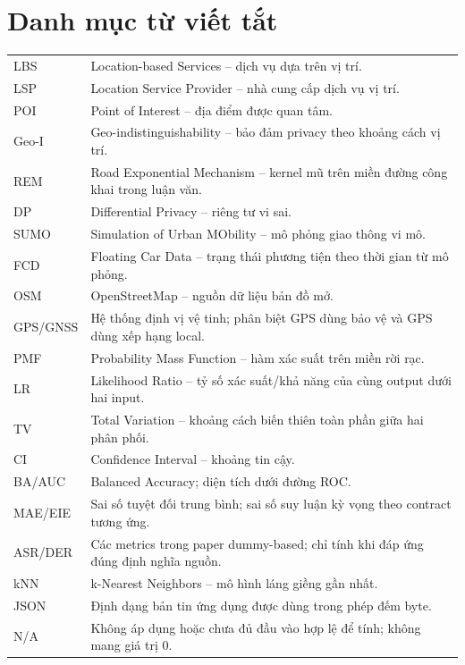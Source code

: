 \chapter*{Danh mục từ viết tắt}
\begin{small}
\begin{longtable}{@{}P{2.1cm}P{13.4cm}@{}}
LBS & Location-based Services -- dịch vụ dựa trên vị trí.\\
LSP & Location Service Provider -- nhà cung cấp dịch vụ vị trí.\\
POI & Point of Interest -- địa điểm được quan tâm.\\
Geo-I & Geo-indistinguishability -- bảo đảm privacy theo khoảng cách vị trí.\\
REM & Road Exponential Mechanism -- kernel mũ trên miền đường công khai trong luận văn.\\
DP & Differential Privacy -- riêng tư vi sai.\\
SUMO & Simulation of Urban MObility -- mô phỏng giao thông vi mô.\\
FCD & Floating Car Data -- trạng thái phương tiện theo thời gian từ mô phỏng.\\
OSM & OpenStreetMap -- nguồn dữ liệu bản đồ mở.\\
GPS/GNSS & Hệ thống định vị vệ tinh; phân biệt GPS dùng bảo vệ và GPS dùng xếp hạng local.\\
PMF & Probability Mass Function -- hàm xác suất trên miền rời rạc.\\
LR & Likelihood Ratio -- tỷ số xác suất/khả năng của cùng output dưới hai input.\\
TV & Total Variation -- khoảng cách biến thiên toàn phần giữa hai phân phối.\\
CI & Confidence Interval -- khoảng tin cậy.\\
BA/AUC & Balanced Accuracy; diện tích dưới đường ROC.\\
MAE/EIE & Sai số tuyệt đối trung bình; sai số suy luận kỳ vọng theo contract tương ứng.\\
ASR/DER & Các metrics trong paper dummy-based; chỉ tính khi đáp ứng đúng định nghĩa nguồn.\\
kNN & k-Nearest Neighbors -- mô hình láng giềng gần nhất.\\
JSON & Định dạng bản tin ứng dụng được dùng trong phép đếm byte.\\
N/A & Không áp dụng hoặc chưa đủ đầu vào hợp lệ để tính; không mang giá trị 0.\\
\end{longtable}\end{small}

